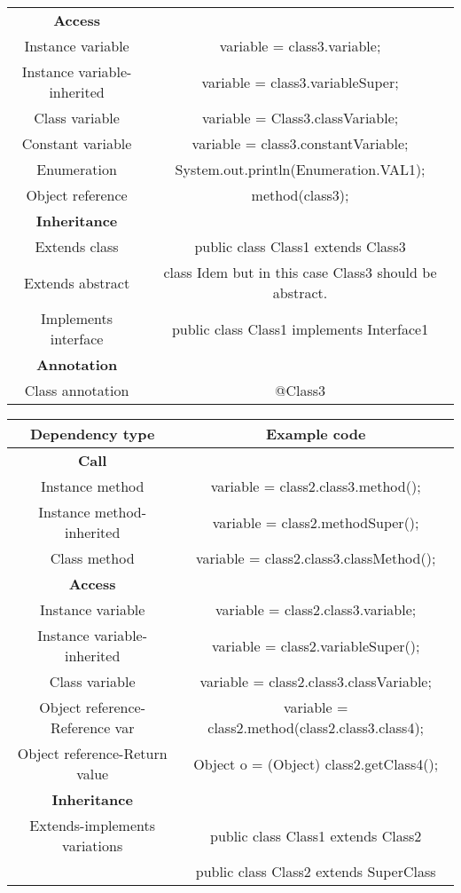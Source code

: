 \begin{center}
\begin{tabular}{|c c|}
        \textbf{Access} &  \\
        Instance variable & variable = class3.variable; \\
        Instance variable-inherited & variable = class3.variableSuper; \\
        Class variable & variable = Class3.classVariable; \\
        Constant variable & variable = class3.constantVariable; \\
        Enumeration & System.out.println(Enumeration.VAL1); \\
        Object reference & method(class3); \\
        \textbf{Inheritance} &  \\
        Extends class & public class Class1 extends Class3 { } \\
        Extends abstract & class Idem but in this case Class3 should be abstract. \\
        Implements interface & public class Class1 implements Interface1 { } \\
        \textbf{Annotation} &  \\
        Class annotation & @Class3 \\
        \hline
    \end{tabular}
\end{center}

\begin{center}
    \begin{tabular}{|c c|}
        \hline
        Dependency type & Example code \\
        \hline
        \textbf{Call} &  \\
        Instance method & variable = class2.class3.method(); \\
        Instance method-inherited & variable = class2.methodSuper(); \\
        Class method & variable = class2.class3.classMethod(); \\
        \textbf{Access} &  \\
        Instance variable & variable = class2.class3.variable; \\
        Instance variable-inherited & variable = class2.variableSuper(); \\
        Class variable & variable = class2.class3.classVariable; \\
        Object reference-Reference var & variable = class2.method(class2.class3.class4); \\
        Object reference-Return value & Object o = (Object) class2.getClass4(); \\
        \textbf{Inheritance} &  \\
        Extends-implements variations & public class Class1 extends Class2 { } \\
         & public class Class2 extends SuperClass { } \\
        \hline
    \end{tabular}
\end{center}

